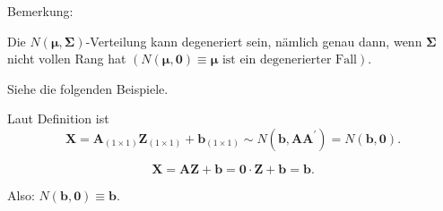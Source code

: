\documentclass{tstextbook}
\begin{document}
 

\begin{remark}
 Bemerkung:

Die $N(\boldsymbol{\mu},\boldsymbol{\Sigma})$-Verteilung kann degeneriert sein, nämlich genau
dann, wenn $\boldsymbol{\Sigma}$ nicht vollen Rang hat $\left(N(\boldsymbol{\mu},\boldsymbol{0})\equiv\boldsymbol{\mu}\text{ ist ein degenerierter Fall}\right)$.
\end{remark}

Siehe die folgenden Beispiele.

\begin{example}[ $\mathbf{Z}\sim N(\boldsymbol{0},\mathbf{1})$, $\mathbf{A}=\boldsymbol{0}$, $\mathbf{b}\in\mathbb{R}.$]
  
  
  Laut Definition ist \[\mathbf{X}=\mathbf{A}_{(1\times1)}\mathbf{Z}_{(1\times1)}+\mathbf{b}_{(1\times1)}\sim N\left(\mathbf{b},\mathbf{AA}^{\prime}\right)=N(\mathbf{b},\boldsymbol{0}).\]
  
  \[
  \mathbf{X}=\mathbf{A}\mathbf{Z}+\mathbf{b}=\boldsymbol{0}\cdot \mathbf{Z}+\mathbf{b}=\mathbf{b}.
  \]
  
  Also: $N(\mathbf{b},\boldsymbol{0})\equiv \mathbf{b}.$
  

\end{example}
\end{document}
